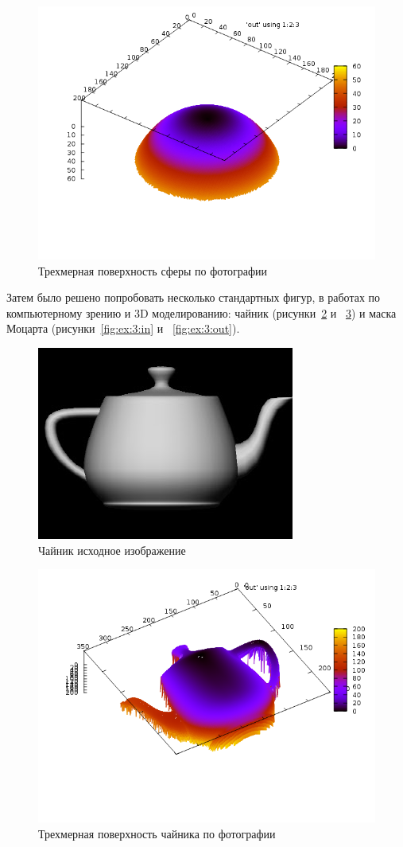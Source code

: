 \documentclass[a4paper,12pt]{article}
\begin{document}
\begin{figure}[H]
  \centering
  \includegraphics[width=0.5\linewidth]{sphere.png}
  \hfil \caption{Трехмерная поверхность сферы по фотографии}
  \label{fig:ex:1:out}
\end{figure}

Затем было решено попробовать несколько стандартных фигур, в работах
по компьютерному зрению и 3D моделированию: чайник
(рисунки~\ref{fig:ex:2:in} и ~\ref{fig:ex:2:out}) и маска Моцарта
(рисунки~\ref{fig:ex:3:in} и ~\ref{fig:ex:3:out}).

\begin{figure}[H]
  \centering
  \includegraphics[width=0.5\linewidth]{teapot_in.jpg}
  \hfil \caption{Чайник исходное изображение}
  \label{fig:ex:2:in}
\end{figure}

\begin{figure}[H]
  \centering
  \includegraphics[width=0.5\linewidth]{teapot.png}
  \hfil \caption{Трехмерная поверхность чайника по фотографии}
  \label{fig:ex:2:out}
\end{figure}
\end{document}
